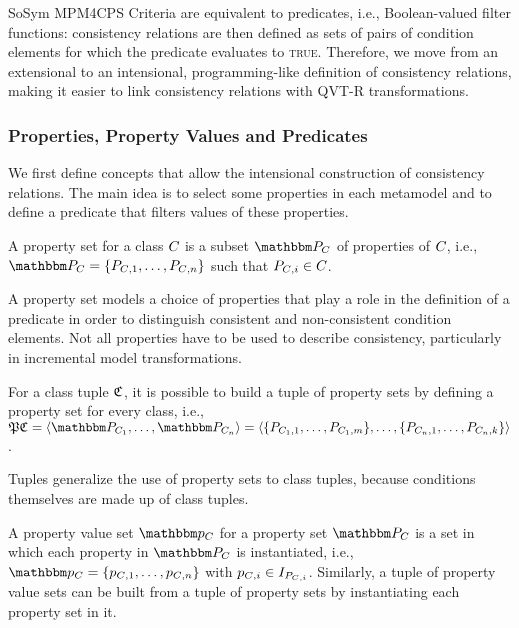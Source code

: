 \begin{copiedFrom}{SoSym MPM4CPS}
Criteria are equivalent to predicates, i.e., Boolean-valued filter functions: consistency relations are then defined as sets of pairs of condition elements for which the predicate evaluates to \textsc{true}. Therefore, we move from an extensional to an intensional, programming-like definition of consistency relations, making it easier to link consistency relations with QVT-R transformations.

\subsubsection{Properties, Property Values and Predicates}

We first define concepts that allow the intensional construction of consistency relations. The main idea is to select some properties in each metamodel and to define a predicate that filters values of these properties.

\begin{definition}
A property set for a class $C_{}$ is a subset $\propertyset{P}{\class{C}{}}$ of properties of $C_{}$, i.e., $\propertyset{P}{\class{C}{}} = \{P_{\class{C}{}, 1}, \dots, P_{\class{C}{}, n}\}$ such that $P_{C_{}, i} \in C_{}$.
\end{definition}

A property set models a choice of properties that play a role in the definition
of a predicate in order to distinguish consistent and non-consistent condition elements. Not all properties have to be used to describe consistency, particularly in incremental model transformations. 

\begin{definition}
For a class tuple $\mathfrak{C}_{}$, it is possible to build a tuple of property sets by defining a property set for every class, i.e., $\propertysettuple{P}{\classtuple{C}{}} = \tupled{\propertyset{P}{\class{C}{1}}, \dots, \propertyset{P}{\class{C}{n}}} = \tupled{\{P_{\class{C}{1}, 1}, \dots, P_{\class{C}{1}, m}\}, \dots, \{P_{\class{C}{n}, 1}, \dots, P_{\class{C}{n}, k}\}}$.
\end{definition}

Tuples generalize the use of property sets to class tuples, because conditions themselves are made up of class tuples.

\begin{definition}
A property value set $\propertyvalueset{p}{\class{C}{}}$ for a property set $\propertyset{P}{\class{C}{}}$ is a set in which each property in $\propertyset{P}{\class{C}{}}$ is instantiated, i.e., $\propertyvalueset{p}{\class{C}{}} = \{p_{\class{C}{}, 1}, \dots, p_{\class{C}{}, n}\}$ with $p_{C_{}, i} \in I_{P_{C_{}, i}}$. Similarly, a tuple of property value sets can be built from a tuple of property sets by instantiating each property set in it.
\end{definition}


\end{copiedFrom}
